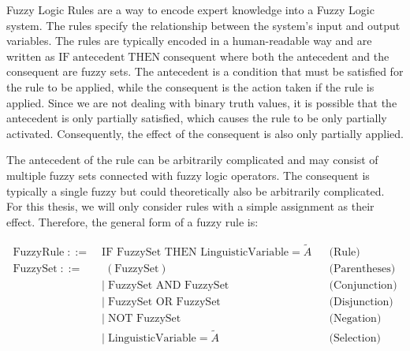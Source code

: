 Fuzzy Logic Rules are a way to encode expert knowledge into a Fuzzy Logic system. The rules specify the relationship between the system's input and output variables.
The rules are typically encoded in a human-readable way and are written as \emph{$\text{IF} \; \text{antecedent} \; \text{THEN} \; \text{consequent}$} where both the antecedent and the consequent are fuzzy sets. The antecedent is a condition that must be satisfied for the rule to be applied, while the consequent is the action taken if the rule is applied. Since we are not dealing with binary truth values, it is possible that the antecedent is only partially satisfied, which causes the rule to be only partially activated. Consequently, the effect of the consequent is also only partially applied.

The antecedent of the rule can be arbitrarily complicated and may consist of multiple fuzzy sets connected with fuzzy logic operators. The consequent is typically a single fuzzy but could theoretically also be arbitrarily complicated. For this thesis, we will only consider rules with a simple assignment as their effect. Therefore, the general form of a fuzzy rule is:

\newcommand{\fuzzyset}{\langle \text{fuzzy set} \rangle}

\newcommand{\fuzzyrule}{\langle \text{rule} \rangle}

\begin{align*}
      \text{FuzzyRule} \;::=\; & \text{IF } \text{FuzzySet } \text{THEN } \text{LinguisticVariable}=\tilde{A} &  & \text{(Rule)}        \\[10pt]
      \text{FuzzySet} \;::=\;  & \; (\text{FuzzySet})                                                         &  & \text{(Parentheses)} \\
                               & | \;\text{FuzzySet } \text{AND } \text{FuzzySet}                             &  & \text{(Conjunction)} \\
                               & | \;\text{FuzzySet } \text{OR } \text{FuzzySet}                              &  & \text{(Disjunction)} \\
                               & | \;\text{NOT } \text{FuzzySet}                                              &  & \text{(Negation)}    \\
                               & | \;\text{LinguisticVariable} = \tilde{A}                                    &  & \text{(Selection)}
\end{align*}

